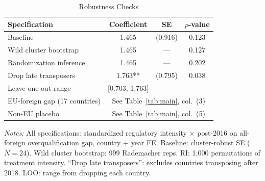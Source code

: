 \begin{table}[t]
\centering
\caption{Robustness Checks}
\label{tab:robustness}
\begin{tabular}{lccc}
\toprule
Specification & Coefficient & SE & $p$-value \\
\midrule
Baseline & 1.465 & (0.916) & 0.123 \\
Wild cluster bootstrap & 1.465 & --- & 0.127 \\
Randomization inference & 1.465 & --- & 0.202 \\
Drop late transposers & 1.763** & (0.795) & 0.038 \\
Leave-one-out range & [0.703, 1.763] & & \\
\midrule
EU-foreign gap (17 countries) & \multicolumn{3}{c}{See Table~\ref{tab:main}, col.~(3)} \\
Non-EU placebo & \multicolumn{3}{c}{See Table~\ref{tab:main}, col.~(5)} \\
\bottomrule
\end{tabular}
\begin{tablenotes}[flushleft]\footnotesize
\item \textit{Notes:} All specifications: standardized regulatory intensity $\times$ post-2016 on all-foreign overqualification gap, country + year FE. Baseline: cluster-robust SE ($N = 24$). Wild cluster bootstrap: 999 Rademacher reps. RI: 1,000 permutations of treatment intensity. ``Drop late transposers'': excludes countries transposing after 2018. LOO: range from dropping each country.
\end{tablenotes}
\end{table}
